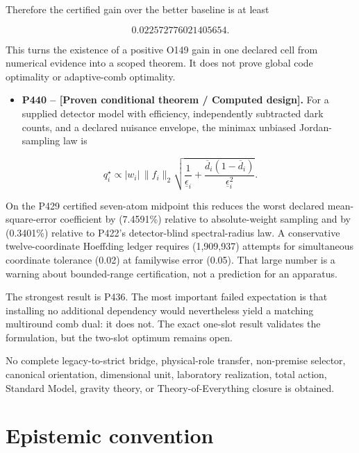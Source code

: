 \documentclass[11pt,a4paper,openany]{report}
\begin{document}
Therefore the certified gain over the better baseline is at least

\[
0.022572776021405654.
\]

This turns the existence of a positive O149 gain in one declared cell from numerical evidence into a scoped theorem. It does not prove global code optimality or adaptive-comb optimality.

\begin{itemize}
\item 
\textbf{P440 -- [Proven conditional theorem /\allowbreak{} Computed design].} For a supplied detector model with efficiency, independently subtracted dark counts, and a declared nuisance envelope, the minimax unbiased Jordan-sampling law is

\end{itemize}

\[
q_i^\star\propto
|w_i|\,\|f_i\|_2
\sqrt{
\frac1{\underline\epsilon_i}
+\frac{\overline d_i(1-\overline d_i)}{\underline\epsilon_i^2}
}.
\]

On the P429 certified seven-atom midpoint this reduces the worst declared mean-square-error coefficient by (7.4591\%) relative to absolute-weight sampling and by (0.3401\%) relative to P422's detector-blind spectral-radius law. A conservative twelve-coordinate Hoeffding ledger requires (1,909,937) attempts for simultaneous coordinate tolerance (0.02) at familywise error (0.05). That large number is a warning about bounded-range certification, not a prediction for an apparatus.

The strongest result is P436. The most important failed expectation is that installing no additional dependency would nevertheless yield a matching multiround comb dual: it does not. The exact one-slot result validates the formulation, but the two-slot optimum remains open.

No complete legacy-to-strict bridge, physical-role transfer, non-premise selector, canonical orientation, dimensional unit, laboratory realization, total action, Standard Model, gravity theory, or Theory-of-Everything closure is obtained.

\chapter{Epistemic convention}
\end{document}
